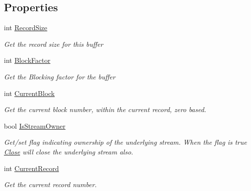 \subsection*{Properties}
\begin{DoxyCompactItemize}
\item 
int \hyperlink{class_i_c_sharp_code_1_1_sharp_zip_lib_1_1_tar_1_1_tar_buffer_adf7557320463a7ade141d2161cfacf38}{Record\+Size}
\begin{DoxyCompactList}\small\item\em Get the record size for this buffer \end{DoxyCompactList}\item 
int \hyperlink{class_i_c_sharp_code_1_1_sharp_zip_lib_1_1_tar_1_1_tar_buffer_add6a353dfa4c8321ccd5a5e54b7d5958}{Block\+Factor}
\begin{DoxyCompactList}\small\item\em Get the Blocking factor for the buffer \end{DoxyCompactList}\item 
int \hyperlink{class_i_c_sharp_code_1_1_sharp_zip_lib_1_1_tar_1_1_tar_buffer_a369ffe3034447c016f1bc485feac3fd6}{Current\+Block}
\begin{DoxyCompactList}\small\item\em Get the current block number, within the current record, zero based. \end{DoxyCompactList}\item 
bool \hyperlink{class_i_c_sharp_code_1_1_sharp_zip_lib_1_1_tar_1_1_tar_buffer_abdd112527b91a699166eb2bc46fe7d42}{Is\+Stream\+Owner}
\begin{DoxyCompactList}\small\item\em Get/set flag indicating ownership of the underlying stream. When the flag is true \hyperlink{class_i_c_sharp_code_1_1_sharp_zip_lib_1_1_tar_1_1_tar_buffer_a3afc582eabfc493257c71e2fd317b3cc}{Close} will close the underlying stream also. \end{DoxyCompactList}\item 
int \hyperlink{class_i_c_sharp_code_1_1_sharp_zip_lib_1_1_tar_1_1_tar_buffer_a759d01e11ffdcdc372cdcdbde3852000}{Current\+Record}
\begin{DoxyCompactList}\small\item\em Get the current record number. \end{DoxyCompactList}\end{DoxyCompactItemize}


